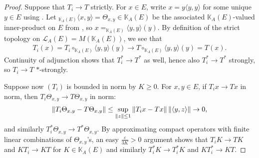 \begin{proof}
	Suppose that $T_i \to T$ strictly. For $x \in E$, write $x = y\langle y,y\rangle$ for some unique $y \in E$ using . Let $_{\mathbb{K}_A(E)}\langle x,y \rangle = \Theta_{x,y} \in \mathbb{K}_A(E)$ be the associated $\mathbb{K}_A(E)$-valued inner-product on $E$ from , so $x = _{\mathbb{K}_A(E)} \langle y, y \rangle (y)$. By definition of the strict topology on $\mathcal{L}_A(E) = M(\mathbb{K}_A(E))$, we see that 
	\begin{align*}
		T_i(x) = T_i \circ _{\mathbb{K}_A(E)}\langle y,y\rangle (y) \to T \circ _{\mathbb{K}_A(E)} \langle y,y \rangle(y) = T(x).
	\end{align*}
	Continuity of adjunction shows that $T_i^* \to T^*$ as well, hence also $T_i^* \to T^*$ strongly, so $T_i \to T$ $*$-strongly.

	Suppose now $(T_i)$ is bounded in norm by $K \geq 0$. For $x, y \in E$, if $T_i x \to Tx$ in norm, then $T_i \Theta_{x,y} \to T \Theta_{x,y}$ in norm:
	\begin{align*}
		\left\lVert T_i \Theta_{x,y} - T \Theta_{x,y}\right\rVert  \leq \sup_{\left\lVert z \right\rVert \leq 1} \left\lVert T_i x - T x \right\rVert \left\lVert \langle y,z\rangle \right\rVert \to 0,
	\end{align*}
	and similarly $T_i^* \Theta_{x,y} \to T^* \Theta_{x,y}$. By approximating compact operators with finite linear combinations of $\Theta_{x,y}$'s, an easy $\frac{\varepsilon}{3K}>0$ argument shows that $T_i K \to T K$ and $KT_i \to KT$ for $K \in \mathbb{K}_A(E)$ and similarly $T_i^*K \to T_i^*K$ and $KT_i^* \to K T$.
\end{proof}

